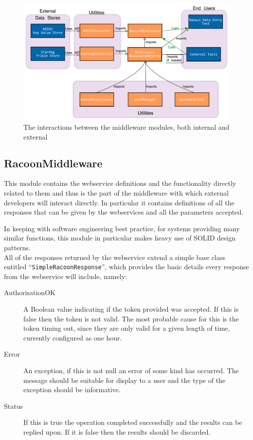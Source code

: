 \begin{figure}
\myfloatalign
\includegraphics[max height=0.9\textwidth]{gfx/MiddlewareHighLevel}
\caption{The interactions between the middleware modules, both internal and external}
\label{fig:MiddlewareHL}
\end{figure}

\subsection{RacoonMiddleware}
\label{sec:middlewaremodule}
This module contains the webservice definitions and the functionality directly related to them and thus is the part of the middleware with which external developers will interact directly. In particular it contains definitions of all the responses that can be given by the webservices and all the parameters accepted.

In keeping with software engineering best practice, for systems providing many similar functions, this module in particular makes heavy use of SOLID design patterns. \\ All of the responses returned by the webservice extend a simple base class entitled \enquote{\texttt{SimpleRacoonResponse}}, which provides the basic details every response from the webservice will include, namely:
\begin{description}
    \item[AuthorisationOK] A Boolean value indicating if the token provided was accepted. If this is false then the token is not valid. The most probable cause for this is the token timing out, since they are only valid for a given length of time, currently configured as one hour.
    \item[Error] An exception, if this is not null an error of some kind has occurred. The message should be suitable for display to a user and the type of the exception should be informative.
    \item[Status] If this is true the operation completed successfully and the results can be replied upon. If it is false then the results should be discarded. 
\end{description}

